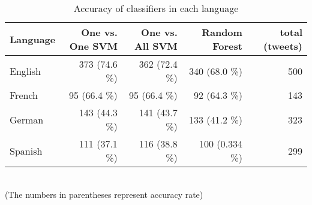 \begin{table}[ht]
	\caption{Accuracy of classifiers in each language}
	\begin{tabular}{|l|r|r|r|r|} \hline
	Language &One vs. One SVM &One vs. All SVM&Random Forest & total (tweets)\\ \hline
	English & 373 (74.6 \%) & 362 (72.4 \%)& 340 (68.0 \%)& 500\\ \hline
	French & 95 (66.4 \%)  & 95 (66.4 \%)& 92 (64.3 \%)& 143 \\ \hline
	German & 143 (44.3 \%)& 141 (43.7 \%)& 133 (41.2 \%)& 323 \\ \hline
	Spanish & 111 (37.1 \%)& 116 (38.8 \%)& 100 (0.334 \%)& 299 \\ \hline
	\end{tabular}
	\label{tab:accuracy}
	\\ (The numbers in parentheses represent accuracy rate)
\end{table}

\begin{comment}
The other values of this combination are also smaller (9.268 and 16.687) compared to the other ones, in which some of the $\chi^2$ statistics are more than a hundred or even a thousand.
An interesting thing is that the $\chi^2$ statistics of the two cities in Spain, Barcelona and Madrid are small too (18.855, 13.669 and 11.606).
But it is not applied to the case of the two cities in Germany (302.720, 359.948 and 80.490) but the case of the two German-Speaking cities, Hamburg and Vienna (30.195, 36.876 and 19.382).
So far this outcome shows that the distributions of sentiment value between two cities are not independent of location almost all of the case in the experiment.
Thus, we can conclude the classifiers trained by the training dataset work well to perform a sentiment analysis by city.
\end{comment}

